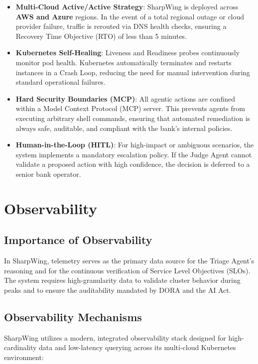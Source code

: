\documentclass[12pt]{report}
\begin{document}
\begin{itemize}
    \item \textbf{Multi-Cloud Active/Active Strategy}: SharpWing is deployed across \textbf{AWS and Azure} regions. In the event of a total regional outage or cloud provider failure, traffic is rerouted via DNS health checks, ensuring a Recovery Time Objective (RTO) of less than 5 minutes.
    
    \item \textbf{Kubernetes Self-Healing}: Liveness and Readiness probes continuously monitor pod health. Kubernetes automatically terminates and restarts instances in a Crash Loop, reducing the need for manual intervention during standard operational failures.
    
    \item \textbf{Hard Security Boundaries (MCP)}: All agentic actions are confined within a Model Context Protocol (MCP) server. This prevents agents from executing arbitrary shell commands, ensuring that automated remediation is always safe, auditable, and compliant with the bank's internal policies.
    
    \item \textbf{Human-in-the-Loop (HITL)}: For high-impact or ambiguous scenarios, the system implements a mandatory escalation policy. If the Judge Agent cannot validate a proposed action with high confidence, the decision is deferred to a senior bank operator.
\end{itemize}

\chapter{Observability}
\label{ch:observability}

\section{Importance of Observability}

In SharpWing, telemetry serves as the primary data source for the Triage Agent's reasoning and for the continuous verification of Service Level Objectives (SLOs). The system requires high-granularity data to validate cluster behavior during peaks and to ensure the auditability mandated by DORA and the AI Act.

\section{Observability Mechanisms}
SharpWing utilizes a modern, integrated observability stack designed for high-cardinality data and low-latency querying across its multi-cloud Kubernetes environment:
\end{document}
